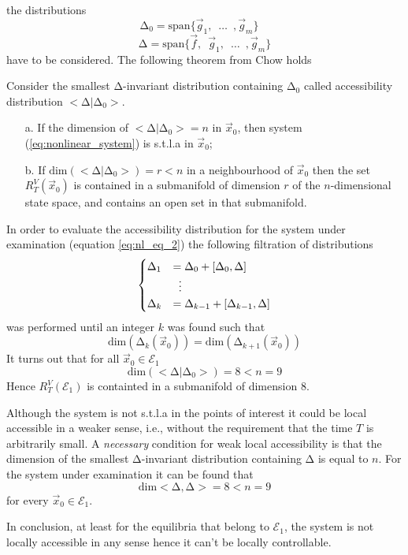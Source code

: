 the distributions
\[
\mathrm{\Delta}_0 = \mathrm{span} \{\vec{g}_1, \enspace \hdots \enspace, \vec{g}_m\} \quad
\]
\[
\mathrm{\Delta} = \mathrm{span} \{\vec{f},\enspace\vec{g}_1, \enspace \hdots \enspace, \vec{g}_m\}
\]
have to be considered. The following theorem from Chow holds
\begin{theorem}
  Consider the smallest $\mathrm{\Delta}$-invariant distribution containing $\mathrm{\Delta}_0$ called
  accessibility distribution $<\mathrm{\Delta}|\mathrm{\Delta}_0>$.
  \begin{itemize}
  \item[a.]If the dimension of $<\mathrm{\Delta}|\mathrm{\Delta}_0>= n$ in $\vec{x}_0$, then system (\ref{eq:nonlinear_system})
    is s.t.l.a in $\vec{x}_{0}$;
  \item[b.]If $\mathrm{dim}(<\mathrm{\Delta}|\mathrm{\Delta}_0>)= r < n$ in a neighbourhood of $\vec{x}_0$
    then the set $R_{T}^{V}(\vec{x}_0)$ is contained in a submanifold of dimension $r$ of the
    $n$-dimensional state space, and contains an open set in that submanifold.
  \end{itemize}
\end{theorem}
In order to evaluate the accessibility distribution for the system under examination
(equation \ref{eq:nl_eq_2}) the following filtration of distributions
\[
\begin{cases}
\mathrm{\Delta}_1 &= \mathrm{\Delta}_0 + [\mathrm{\Delta}_0,\mathrm{\Delta}]\\
&\vdotswithin{=} \\
\mathrm{\Delta}_k &= \mathrm{\Delta}_{k-1} + [\mathrm{\Delta}_{k-1},\mathrm{\Delta}]
\end{cases}
\]
was performed until an integer $k$ was found such that
\[
\text{dim}(\mathrm{\Delta}_{k}(\vec{x}_0)) = \text{dim}(\mathrm{\Delta}_{k+1}(\vec{x}_0))
\]
It turns out that for all $\vec{x}_{0} \in \mathcal{E}_{1}$
\[
\mathrm{dim}(<\mathrm{\Delta}|\mathrm{\Delta}_0>) = 8 < n = 9
\]
Hence $R_{T}^{V}(\mathcal{E}_{1})$ is containted in a submanifold of dimension $8$.
\par
Although the system is not s.t.l.a in the points of interest it could be local accessible
in a weaker sense, i.e., without the requirement that the time $T$ is arbitrarily small.
A \emph{necessary} condition for weak local accessibility is that the dimension of the smallest
$\mathrm{\Delta}$-invariant distribution containing $\mathrm{\Delta}$ is equal to $n$.
For the system under examination it can be found that
\[
\mathrm{dim} <\mathrm{\Delta},\mathrm{\Delta}> = 8 < n = 9
\]
for every $\vec{x}_0 \in \mathcal{E}_1$.
\par
In conclusion, at least for the equilibria that belong to $\mathcal{E}_1$, the
system is not locally accessible in any sense hence it can't be locally controllable.

\newpage
